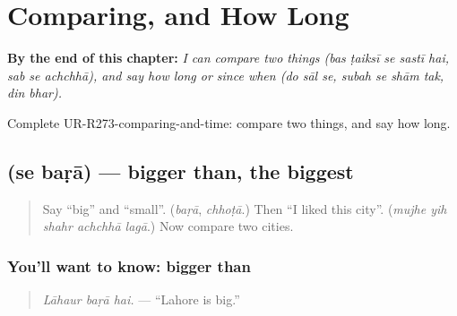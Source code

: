 
\chapter{Comparing, and How Long}
\label{ch:ur-comparing-and-how-long}

\begin{chapteropening}
\textbf{By the end of this chapter:} \emph{I can compare two things (bas ṭaiksī se sastī hai, sab se achchhā), and say how long or since when (do sāl se, subah se shām tak, din bhar).}

Complete UR-R273-comparing-and-time: compare two things, and say how long.
\end{chapteropening}

\section[\texorpdfstring{\ur{سے} \ur{بڑا} (se baṛā)}{سے بڑا (se baṛā)}]{  (se baṛā) — bigger than, the biggest}

\label{lesson:UR-C273-se-bara}



\begin{quote}
Say \textquotedblleft{}big\textquotedblright{} and \textquotedblleft{}small\textquotedblright{}. (\emph{baṛā}, \emph{chhoṭā}.) Then \textquotedblleft{}I liked this city\textquotedblright{}. (\emph{mujhe yih shahr achchhā lagā}.) Now compare two cities.
\end{quote}

\subsection*{You'll want to know: bigger than}
\begin{quote}
\textbf{  }
\end{quote}

\begin{quote}
\emph{Lāhaur baṛā hai.} — \textquotedblleft{}Lahore is big.\textquotedblright{}
\end{quote}

\begin{quote}
\textbf{      }
\end{quote}


